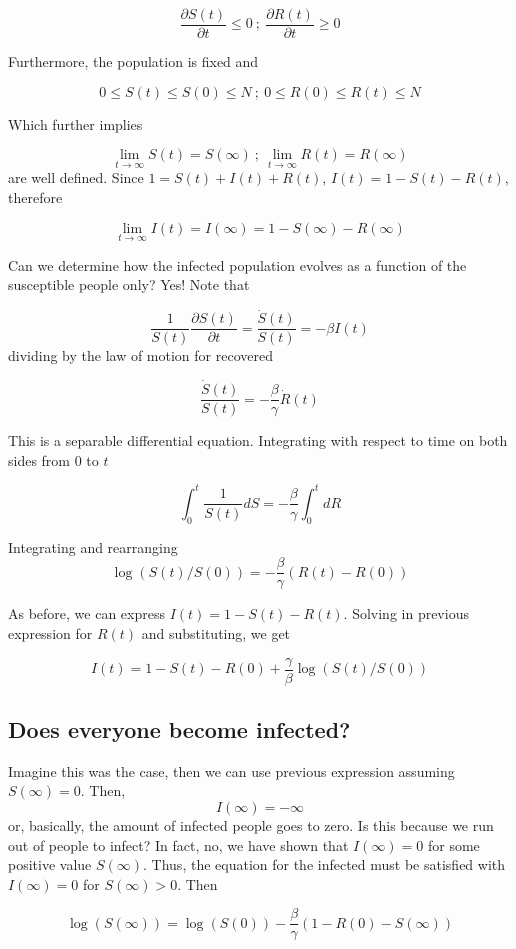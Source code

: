 \documentclass[a4paper,11pt]{article}
\theoremstyle{definition}
\theoremstyle{plain}
\begin{document}
\[ 
\frac{\partial S(t)}{\partial t} \leq 0 \ ; \ \frac{\partial R(t)}{\partial t} \geq 0
\] 

Furthermore, the population is fixed and

\[ 
0 \leq S(t) \leq S(0) \leq N \ ; \ 0 \leq R(0) \leq R(t) \leq N
\] 

Which further implies

\[
\lim_{t\rightarrow \infty} S(t) = S(\infty) \ ; \ \lim_{t\rightarrow \infty} R(t) = R(\infty)
\] 
are well defined. Since \(1 = S(t) + I(t) + R(t)\), \(I(t) = 1 - S(t) - R(t)\), therefore 

\[
\lim_{t\rightarrow\infty} I(t) = I(\infty) = 1 - S(\infty) - R(\infty)
\]

Can we determine how the infected population evolves as a function of the susceptible people only? Yes! Note that

\[
\frac{1}{S(t)}\frac{\partial S(t)}{\partial t} = \frac{\dot{S}(t)}{S(t)} = -\beta I(t)
\] dividing by the law of motion for recovered

\[
\frac{\dot{S}(t)}{S(t)} = -\frac{\beta}{\gamma}\dot{R}(t)
\]

This is a separable differential equation. Integrating with respect to
time on both sides from \(0\) to \(t\)

\[
\int_0^t \frac{1}{S(t)} dS = -\frac{\beta}{\gamma}\int^t_0 dR
\]

Integrating and rearranging \[
\log(S(t)/S(0)) = -\frac{\beta}{\gamma}(R(t) - R(0))
\]

As before, we can express \(I(t) = 1 - S(t) - R(t)\). Solving in
previous expression for \(R(t)\) and substituting, we get

\[
I(t) = 1 - S(t) - R(0) + \frac{\gamma}{\beta}\log(S(t)/S(0))
\]

\subsection{Does everyone become infected?}\label{does-everyone-become-infected}

Imagine this was the case, then we can use previous expression assuming \(S(\infty) = 0\). Then, \[
I(\infty) = -\infty \] or, basically, the amount of infected people goes to zero.
 Is this because we run out of people to infect? In fact, no, we have shown that \(I(\infty) = 0\) for some positive value \(S(\infty)\). Thus, the equation for the infected must be satisfied with
\(I(\infty) = 0\) for \(S(\infty) > 0\). Then  

\[
\log(S(\infty)) = \log(S(0)) - \frac{\beta}{\gamma}(1 - R(0) - S(\infty)) 
\]
\end{document}
